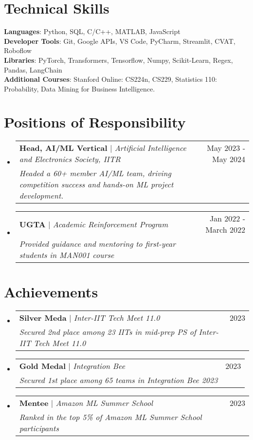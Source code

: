 \documentclass[letterpaper,11pt]{article}
\makeatletter
\newcommand{\resumeProjectHeading}[3]{
    \item
    \begin{tabular*}{0.97\textwidth}{l@{\extracolsep{\fill}}r}
      \small#1 & #2 \\
    \textit{\footnotesize{#3}}
    \end{tabular*}\vspace{-7pt}
}
\newcommand{\resumeSubHeadingListStart}{\begin{itemize}[leftmargin=0.15in, label={}]}
\newcommand{\resumeSubHeadingListEnd}{\end{itemize}}
\makeatother
\begin{document}
\section{Technical Skills}
 \begin{itemize}[leftmargin=0.15in, label={}]
    \small{\item{
     \textbf{Languages}{: Python, SQL, C/C++, MATLAB, JavaScript} \\
     \textbf{Developer Tools}{: Git, Google APIs, VS Code, PyCharm, Streamlit, CVAT, Roboflow} \\
     \textbf{Libraries}{: PyTorch, Transformers, Tensorflow, Numpy, Scikit-Learn, Regex, Pandas, LangChain} \\
     \textbf{Additional Courses}{: Stanford Online: CS224n, CS229, Statistics 110: Probability, Data Mining for Business Intelligence.}
    }}
 \end{itemize}



 \section{Positions of Responsibility}
 \resumeSubHeadingListStart
     \resumeProjectHeading
       {\textbf{Head, AI/ML Vertical} $|$ \emph{Artificial Intelligence and Electronics Society, IITR}}{May 2023 - May 2024}
       {Headed a 60+ member AI/ML team, driving competition success and hands-on ML project development.}

     \resumeProjectHeading
       {\textbf{UGTA} $|$ \emph{Academic Reinforcement Program}}{Jan 2022 - March 2022}
       {Provided guidance and mentoring to first-year students in MAN001 course}
 \resumeSubHeadingListEnd

\section{Achievements}
 \resumeSubHeadingListStart
     \resumeProjectHeading
       {\textbf{Silver Meda} $|$ \emph{Inter-IIT Tech Meet 11.0}}{2023}
       {Secured 2nd place among 23 IITs in mid-prep PS of Inter-IIT Tech Meet 11.0}

     \resumeProjectHeading
       {\textbf{Gold Medal} $|$ \emph{Integration Bee}}{2023}
       {Secured 1st place among 65 teams in Integration Bee 2023}
     \resumeProjectHeading
       {\textbf{Mentee} $|$ \emph{Amazon ML Summer School}}{2023}
       {Ranked in the top 5\% of Amazon ML Summer School participants}
 \resumeSubHeadingListEnd

\end{document}
